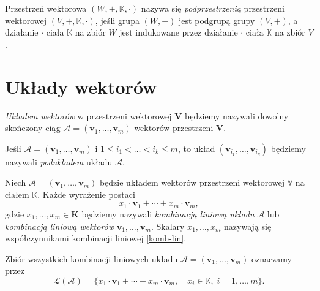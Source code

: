 	\begin{df}
		Przestrzeń wektorowa $(W, +, \mathbb{K}, \cdot)$ nazywa się \textit{podprzestrzenią} przestrzeni wektorowej $(V, +, \mathbb{K}, \cdot)$, jeśli grupa $(W, +)$ jest podgrupą grupy $(V, +)$, a działanie $\cdot$ ciała $\mathbb{K}$ na zbiór $W$ jest indukowane przez działanie $\cdot$ ciała $\mathbb{K}$ na zbiór $V$.
	\end{df}
	
	\section{Układy wektorów}
	\begin{df}
		\textit{Układem wektorów} w przestrzeni wektorowej $\textbf{V}$ będziemy nazywali dowolny skończony ciąg $\mathcal{A} =(\textbf{v}_1, \ldots, \textbf{v}_m)$  wektorów przestrzeni \textbf{V}.
	\end{df}
	
	\begin{df}
		Jeśli $\mathcal{A} =(\textbf{v}_1, \ldots, \textbf{v}_m)$ i $1 \leq i_1 < \ldots < i_k \leq m$, to układ $(\textbf{v}_{i_1}, \ldots, \textbf{v}_{i_k})$ będziemy nazywali \textit{podukładem} układu $\mathcal{A}$.
	\end{df}
	
	\begin{df}
		Niech $\mathcal{A} =(\textbf{v}_1, \ldots, \textbf{v}_m)$ będzie układem wektorów przestrzeni wektorowej $\mathbb{V}$ na ciałem $\mathbb{K}$. Każde wyrażenie postaci
		\begin{equation}\label{komb-lin}
			x_1 \cdot \textbf{v}_1 + \cdots + x_m \cdot \textbf{v}_m,
		\end{equation}
		gdzie $x_1,\ldots, x_m \in \textbf{K}$ będziemy nazywali \textit{kombinacją liniową układu} $\mathcal{A}$ lub \textit{kombinacją liniową wektorów} $\textbf{v}_1, \ldots, \textbf{v}_m$. Skalary $x_1,\ldots, x_m$ nazywają się współczynnikami kombinacji liniowej \ref{komb-lin}.
	\end{df}
	
	\begin{uwg}
		Zbiór wszystkich kombinacji liniowych układu  $\mathcal{A} =(\textbf{v}_1, \ldots, \textbf{v}_m)$ oznaczamy przez 
		\begin{equation*}
			\mathcal{L}(\mathcal{A}) = \{ x_1 \cdot \textbf{v}_1 + \cdots + x_m \cdot \textbf{v}_m, \quad x_i \in \mathbb{K}, \; i = 1, \ldots, m \}.
		\end{equation*}
	\end{uwg}

